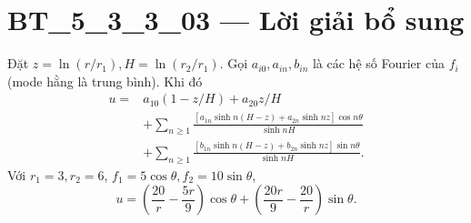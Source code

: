\documentclass[10pt,a4paper]{article}
\begin{document}
\section*{BT\_5\_3\_3\_03 — Lời giải bổ sung}
Đặt $z=\ln(r/r_1),H=\ln(r_2/r_1)$. Gọi $a_{i0},a_{in},b_{in}$ là các hệ số Fourier của $f_i$ (mode hằng là trung bình). Khi đó
\begin{align*}
u={}&a_{10}(1-z/H)+a_{20}z/H\\
&+\sum_{n\ge1}\frac{[a_{1n}\sinh n(H-z)+a_{2n}\sinh nz]\cos n\theta}{\sinh nH}\\
&+\sum_{n\ge1}\frac{[b_{1n}\sinh n(H-z)+b_{2n}\sinh nz]\sin n\theta}{\sinh nH}.
\end{align*}
Với $r_1=3,r_2=6$, $f_1=5\cos\theta,f_2=10\sin\theta$,
\[u=\left(\frac{20}r-\frac{5r}9\right)\cos\theta+\left(\frac{20r}9-\frac{20}r\right)\sin\theta.\]
\end{document}
